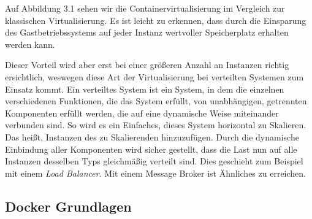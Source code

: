 \documentclass[12pt,a4paper]{scrartcl}
\begin{document}
Auf Abbildung 3.1 sehen wir die Containervirtualisierung im Vergleich zur klassischen Virtualisierung. Es ist leicht zu erkennen, dass durch die Einsparung des Gastbetriebssystems auf jeder Instanz wertvoller Speicherplatz erhalten werden kann.\cite{docOvr}

Dieser Vorteil wird aber erst bei einer größeren Anzahl an Instanzen richtig ersichtlich, weswegen diese Art der Virtualisierung bei verteilten Systemen zum Einsatz kommt. Ein verteiltes System ist ein System, in dem die einzelnen verschiedenen Funktionen, die das System erfüllt, von unabhängigen, getrennten Komponenten erfüllt werden, die auf eine dynamische Weise miteinander verbunden sind. So wird es ein Einfaches, dieses System horizontal zu Skalieren. Das heißt, Instanzen des zu Skalierenden hinzuzufügen. Durch die dynamische Einbindung aller Komponenten wird sicher gestellt, dass die Last nun auf alle Instanzen desselben Typs gleichmäßig verteilt sind. Dies geschieht zum Beispiel mit einem \emph{Load Balancer}. Mit einem Message Broker ist Ähnliches zu erreichen.

\subsection{Docker Grundlagen}
\end{document}
